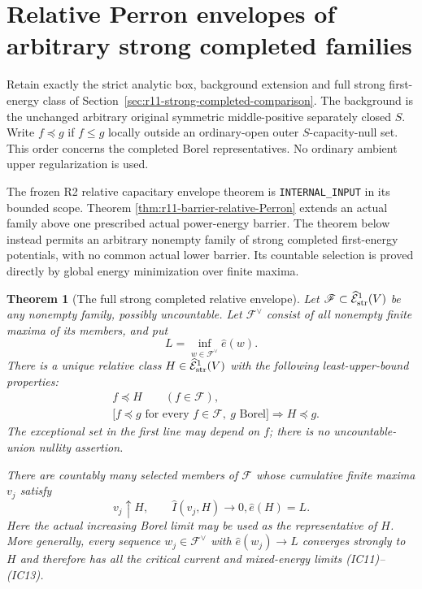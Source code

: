\documentclass[11pt,a4paper]{article}
\numberwithin{equation}{section}
\newtheorem{theorem}{Theorem}[section]
\theoremstyle{definition}
\theoremstyle{remark}
\begin{document}


\section{Relative Perron envelopes of arbitrary strong completed families}
\label{sec:r11-strong-completed-Perron}

Retain exactly the strict analytic box, background extension
and full strong first-energy class of
Section~\ref{sec:r11-strong-completed-comparison}.
The background is the unchanged arbitrary original symmetric
middle-positive separately closed $S$.
Write $f\preceq g$ if $f\leq g$ locally outside an
ordinary-open outer $S$-capacity-null set. This order concerns
the completed Borel representatives. No ordinary ambient
upper regularization is used.

The frozen R2 relative capacitary envelope theorem is
\texttt{INTERNAL\_INPUT} in its bounded scope. Theorem
\ref{thm:r11-barrier-relative-Perron} extends an actual family
above one prescribed actual power-energy barrier. The theorem
below instead permits an arbitrary nonempty family of strong
completed first-energy potentials, with no common actual lower
barrier. Its countable selection is proved directly by global
energy minimization over finite maxima.

\begin{theorem}[The full strong completed relative envelope]
\label{thm:r11-strong-completed-Perron}
Let $\mathscr F\subset\widehat{\mathcal E}^1_{\rm str}(V)$
be any nonempty family, possibly uncountable. Let
$\mathscr F^\vee$ consist of all nonempty finite maxima of
its members, and put
\[
                    L=\inf_{w\in\mathscr F^\vee}\widehat e(w).
 \tag{SE1}
\]
There is a unique relative class
$H\in\widehat{\mathcal E}^1_{\rm str}(V)$ with the following
least-upper-bound properties:
\[
 \begin{split}
 &f\preceq H\qquad(f\in\mathscr F),\\
 &\bigl[f\preceq g\text{ for every }f\in\mathscr F,
                      \ g\text{ Borel}\bigr]
                                      \Longrightarrow H\preceq g.
 \end{split}
 \tag{SE2}
\]
The exceptional set in the first line may depend on $f$;
there is no uncountable-union nullity assertion.

There are countably many selected members of $\mathscr F$
whose cumulative finite maxima $v_j$ satisfy
\[
                  v_j\uparrow H,\qquad
                  \widehat I(v_j,H)\longrightarrow0,
                  \widehat e(H)=L.
 \tag{SE3}
\]
Here the actual increasing Borel limit may be used as the
representative of $H$. More generally, every sequence
$w_j\in\mathscr F^\vee$ with $\widehat e(w_j)\to L$
converges strongly to $H$ and therefore has all the critical
current and mixed-energy limits (IC11)--(IC13).
\end{theorem}
\end{document}

